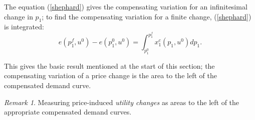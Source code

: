 \documentclass[12pt,a4paper]{article}
\theoremstyle{plain}%
\theoremstyle{definition}
\theoremstyle{remark}
\newtheorem*{rem}{Remark}
\begin{document}
The equation (\ref{shephard}) gives the compensating variation for an infinitesimal change 
in $p_1$; to find the compensating variation for a finite change, 
(\ref{shephard}) is integrated: 
\begin{equation} \label{e_difference}
	e(p_1^f, u^0) - e(p_1^0, u^0) = 
		\int_{p_1^0}^{p_1^f} x_1^c (p_1, u^0) d p_1. 
\end{equation}

This gives the basic result mentioned at the start of this section; the compensating variation 
of a price change is the area to the left of the compensated demand curve. 

\begin{rem}
	Measuring price-induced \emph{utility changes} as areas to the left of the appropriate 
	compensated demand curves. 
\end{rem}



\end{document}
